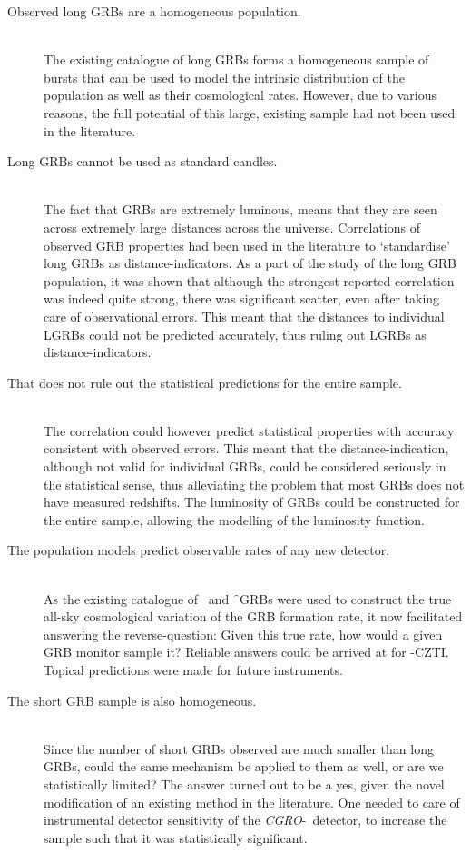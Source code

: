\begin{description}

\item[Observed long GRBs are a homogeneous population.]  \hfill \\
The existing catalogue of long GRBs forms a homogeneous sample of bursts that can be used to model the intrinsic distribution of the population as well as their cosmological rates. However, due to various reasons, the full potential of this large, existing sample had not been used in the literature.

\item[Long GRBs cannot be used as standard candles.] \hfill \\
The fact that GRBs are extremely luminous, means that they are seen across extremely large distances across the universe. Correlations of observed GRB properties had been used in the literature to `standardise' long GRBs as distance-indicators. As a part of the study of the long GRB population, it was shown that although the strongest reported correlation was indeed quite strong, there was significant scatter, even after taking care of observational errors. This meant that the distances to individual LGRBs could not be predicted accurately, thus ruling out LGRBs as distance-indicators.

\item[That does not rule out the statistical predictions for the entire sample.] \hfill \\
The correlation could however predict statistical properties with accuracy consistent with observed errors. This meant that the distance-indication, although not valid for individual GRBs, could be considered seriously in the statistical sense, thus alleviating the problem that most GRBs does not have measured redshifts. The luminosity of GRBs could be constructed for the entire sample, allowing the modelling of the luminosity function.

\item[The population models predict observable rates of any new detector.] \hfill \\
As the existing catalogue of \s\ and \f\ GRBs were used to construct the true all-sky cosmological variation of the GRB formation rate, it now facilitated answering the reverse-question: Given this true rate, how would a given GRB monitor sample it? Reliable answers could be arrived at for \AS -CZTI. Topical predictions were made for future instruments.

\item[The short GRB sample is also homogeneous.] \hfill \\
Since the number of short GRBs observed are much smaller than long GRBs, could the same mechanism be applied to them as well, or are we statistically limited? The answer turned out to be a yes, given the novel modification of an existing method in the literature. One needed to care of instrumental detector sensitivity of the \emph{CGRO}-\B\ detector, to increase the sample such that it was statistically significant.


\end{description}
